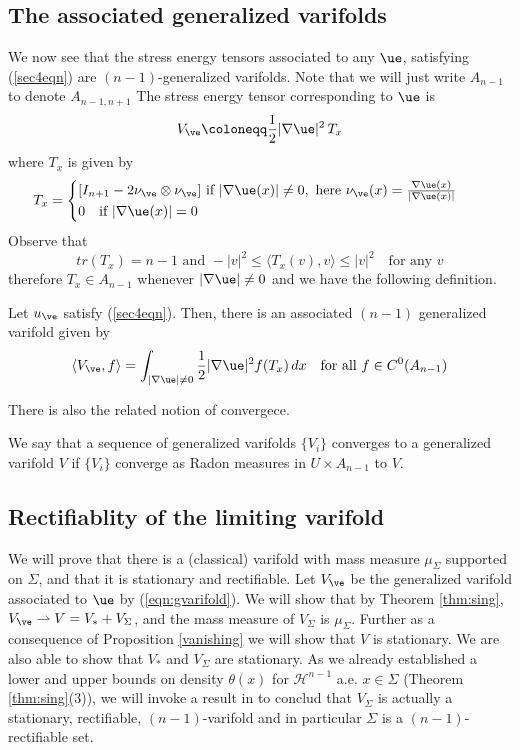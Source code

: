\subsection{The associated generalized varifolds}
We now see that the stress energy tensors associated to any $\ue$, satisfying (\ref{sec4eqn}) are $(n-1)$-generalized varifolds. Note that we will just write $A_{n-1}$ to denote $A_{n-1,n+1}$ The stress energy tensor corresponding to $\ue$ is
\begin{equation} \label{varifold}
V_\ve \coloneqq \frac{1}{2}|\nabla \ue|^2 \, T_x  
\end{equation}
where $T_x$ is given by
\begin{equation} \label{defT}
    T_x =
    \begin{cases}
        [I_{n+1} - 2 \nu_\ve \otimes \nu_\ve] \text{ if }|\nabla \ue (x)| \neq 0, \text{ here } \nu_\ve(x) = \frac{\nabla \ue (x)}{|\nabla \ue (x)|} \quad  \\
        0  \quad \text{if }|\nabla \ue (x)|=0
    \end{cases}
\end{equation}
Observe that 
$$
tr(T_x)=n-1 \text{ and }  -|v|^2 \leq \langle T_x(v),v \rangle \leq |v|^2 \quad \text{for any } v
$$
therefore $T_x \in A_{n-1}$ whenever $|\nabla \ue| \neq 0$ and we have the following definition. 
\begin{defi}
    Let $u_{\ve}$ satisfy (\ref{sec4eqn}). Then, there is an associated $(n-1)$ generalized varifold given by
    \begin{equation} \label{eqn:gvarifold}
    \langle V_\ve,f \rangle = \int_{|\nabla \ue|\neq 0} \frac{1}{2}|\nabla \ue|^2 f(T_x) \,dx \quad \text{for all } f\in C^0(A_{n-1}) 
\end{equation}
\end{defi}

There is also the related notion of convergece. 
\begin{defi}
    We say that a sequence of generalized varifolds $\{V_i\}$ converges to a generalized varifold $V$ if $\{V_i\}$ converge as Radon measures in $U \times A_{n-1}$ to $V$.
\end{defi}


\subsection{Rectifiablity of the limiting varifold} We will prove that there is a (classical) varifold with mass measure $\mu_{\Sigma}$ supported on $\Sigma$, and that it is stationary and rectifiable. Let $V_\ve$ be the generalized varifold associated to $\ue$ by (\ref{eqn:gvarifold}). We will show that by Theorem \ref{thm:sing},  $V_\ve \rightharpoonup V = V_* + V_{\Sigma}$, and the mass measure of $V_\Sigma$ is $\mu_{\Sigma}$. Further as a consequence of Proposition \ref{vanishing} we will show that $V$ is stationary. We are also able to show that $V_*$ and $V_{\Sigma}$ are stationary. As we already established a lower and upper bounds on density $\theta(x)$ for $\mathcal{H}^{n-1}$ a.e. $x \in \Sigma$ (Theorem \ref{thm:sing}(3)),  we will invoke a result in \cite{as} to conclud that $V_{\Sigma}$ is actually a stationary, rectifiable, $(n-1)$-varifold and in particular $\Sigma$ is a $(n-1)$-rectifiable set. 

